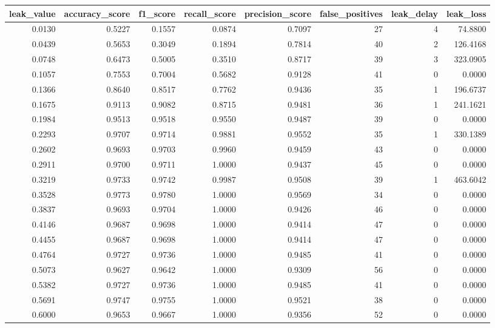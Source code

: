 \begin{tabular}{rrrrrrrr}
\toprule
leak\_value & accuracy\_score & f1\_score & recall\_score & precision\_score & false\_positives & leak\_delay & leak\_loss \\
\midrule
0.0130 & 0.5227 & 0.1557 & 0.0874 & 0.7097 & 27 & 4 & 74.8800 \\
0.0439 & 0.5653 & 0.3049 & 0.1894 & 0.7814 & 40 & 2 & 126.4168 \\
0.0748 & 0.6473 & 0.5005 & 0.3510 & 0.8717 & 39 & 3 & 323.0905 \\
0.1057 & 0.7553 & 0.7004 & 0.5682 & 0.9128 & 41 & 0 & 0.0000 \\
0.1366 & 0.8640 & 0.8517 & 0.7762 & 0.9436 & 35 & 1 & 196.6737 \\
0.1675 & 0.9113 & 0.9082 & 0.8715 & 0.9481 & 36 & 1 & 241.1621 \\
0.1984 & 0.9513 & 0.9518 & 0.9550 & 0.9487 & 39 & 0 & 0.0000 \\
0.2293 & 0.9707 & 0.9714 & 0.9881 & 0.9552 & 35 & 1 & 330.1389 \\
0.2602 & 0.9693 & 0.9703 & 0.9960 & 0.9459 & 43 & 0 & 0.0000 \\
0.2911 & 0.9700 & 0.9711 & 1.0000 & 0.9437 & 45 & 0 & 0.0000 \\
0.3219 & 0.9733 & 0.9742 & 0.9987 & 0.9508 & 39 & 1 & 463.6042 \\
0.3528 & 0.9773 & 0.9780 & 1.0000 & 0.9569 & 34 & 0 & 0.0000 \\
0.3837 & 0.9693 & 0.9704 & 1.0000 & 0.9426 & 46 & 0 & 0.0000 \\
0.4146 & 0.9687 & 0.9698 & 1.0000 & 0.9414 & 47 & 0 & 0.0000 \\
0.4455 & 0.9687 & 0.9698 & 1.0000 & 0.9414 & 47 & 0 & 0.0000 \\
0.4764 & 0.9727 & 0.9736 & 1.0000 & 0.9485 & 41 & 0 & 0.0000 \\
0.5073 & 0.9627 & 0.9642 & 1.0000 & 0.9309 & 56 & 0 & 0.0000 \\
0.5382 & 0.9727 & 0.9736 & 1.0000 & 0.9485 & 41 & 0 & 0.0000 \\
0.5691 & 0.9747 & 0.9755 & 1.0000 & 0.9521 & 38 & 0 & 0.0000 \\
0.6000 & 0.9653 & 0.9667 & 1.0000 & 0.9356 & 52 & 0 & 0.0000 \\
\bottomrule
\end{tabular}
